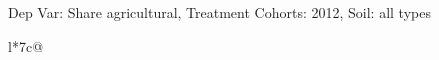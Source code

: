 \begin{table}[H]
\captionlistentry[table]{}
\label{table:beaver_land_class_DVis_land_class_1_SCg1_SSall_soil}
\scriptsize %
Dep Var: Share agricultural, Treatment Cohorts: 2012, Soil: all types \\
\begin{threeparttable}
\begin{tabulary}{\textwidth}{l*{7}{c}@{}}
\toprule \toprule
\noalign{\smallskip}
\noalign{\smallskip}
\midrule \bottomrule
\end{tabulary}
\medskip
\end{threeparttable}
\end{table}
